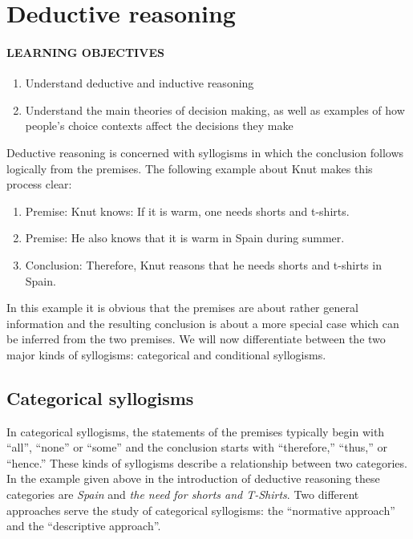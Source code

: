 \documentclass[
]{krantz}
\providecommand{\tightlist}{%
  \setlength{\itemsep}{0pt}\setlength{\parskip}{0pt}}
\begin{document}
\section{Deductive reasoning}\label{deductive-reasoning}

\paragraph*{LEARNING OBJECTIVES}\label{learning-objectives-8}

\begin{enumerate}
\def\labelenumi{\arabic{enumi}.}
\tightlist
\item
  Understand deductive and inductive reasoning
\item
  Understand the main theories of decision making, as well as examples of how people's choice contexts affect the decisions they make
\end{enumerate}

Deductive reasoning is concerned with syllogisms in which the conclusion follows logically from the premises. The following example about Knut makes this process clear:

\begin{enumerate}
\def\labelenumi{\arabic{enumi}.}
\tightlist
\item
  Premise: Knut knows: If it is warm, one needs shorts and t-shirts.
\item
  Premise: He also knows that it is warm in Spain during summer.
\item
  Conclusion: Therefore, Knut reasons that he needs shorts and t-shirts in Spain.
\end{enumerate}

In this example it is obvious that the premises are about rather general information and the resulting conclusion is about a more special case which can be inferred from the two premises. We will now differentiate between the two major kinds of syllogisms: categorical and conditional syllogisms.

\subsection*{Categorical syllogisms}\label{categorical-syllogisms}


In categorical syllogisms, the statements of the premises typically begin with ``all'', ``none'' or ``some'' and the conclusion starts with ``therefore,'' ``thus,'' or ``hence.'' These kinds of syllogisms describe a relationship between two categories. In the example given above in the introduction of deductive reasoning these categories are \emph{Spain} and \emph{the need for shorts and T-Shirts}. Two different approaches serve the study of categorical syllogisms: the ``normative approach'' and the ``descriptive approach''.
\end{document}
